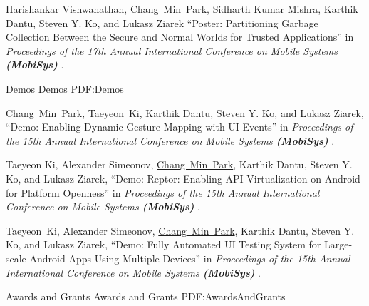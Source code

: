 \documentclass[letterpaper,MMMyyyy,nonstopmode]{simpleresumecv}
\begin{document}
\begin{Body}
\vspace{-0.5ex}

\begingroup
\renewcommand{\MaxNumberedItem}{[88]}

\BigGap
\NumberedItem{[1]}
Harishankar Vishwanathan, \underline{Chang~Min~Park}, Sidharth Kumar Mishra, Karthik Dantu, 
Steven Y. Ko, and Lukasz Ziarek
``Poster: Partitioning Garbage Collection Between the Secure and Normal Worlds for Trusted Applications'' in
\textit{Proceedings of the 17th Annual International Conference on Mobile Systems \textbf{(MobiSys)}
}.



\BigGap
\SubSection
{Demos}
{Demos}
{PDF:Demos}

\vspace{-0.5ex}

\begingroup
\renewcommand{\MaxNumberedItem}{[88]}

\BigGap
\NumberedItem{[1]}
\underline{Chang~Min~Park}, Taeyeon~Ki, Karthik Dantu, Steven Y. Ko, and Lukasz Ziarek, 
``Demo: Enabling Dynamic Gesture Mapping with UI Events'' in
\textit{Proceedings of the 15th Annual International Conference on Mobile Systems \textbf{(MobiSys)}
}.

\Gap
\NumberedItem{[2]}
Taeyeon Ki, Alexander Simeonov, \underline{Chang~Min~Park}, Karthik Dantu, Steven Y. Ko, 
and Lukasz Ziarek, 
``Demo: Reptor: Enabling API Virtualization on Android for Platform Openness'' in
\textit{Proceedings of the 15th Annual International Conference on Mobile Systems \textbf{(MobiSys)}
}.

\Gap
\NumberedItem{[3]}
Taeyeon~Ki, Alexander Simeonov, \underline{Chang~Min~Park}, Karthik Dantu, 
Steven Y. Ko, and Lukasz Ziarek, 
``Demo: Fully Automated UI Testing System for Large-scale Android Apps Using Multiple 
Devices'' in
\textit{Proceedings of the 15th Annual International Conference on Mobile Systems \textbf{(MobiSys)}
}.



\vspace{-0.5ex}
\Section
{Awards and\newline
Grants}
{Awards and Grants}
{PDF:AwardsAndGrants}


\end{Body}
\end{document}
